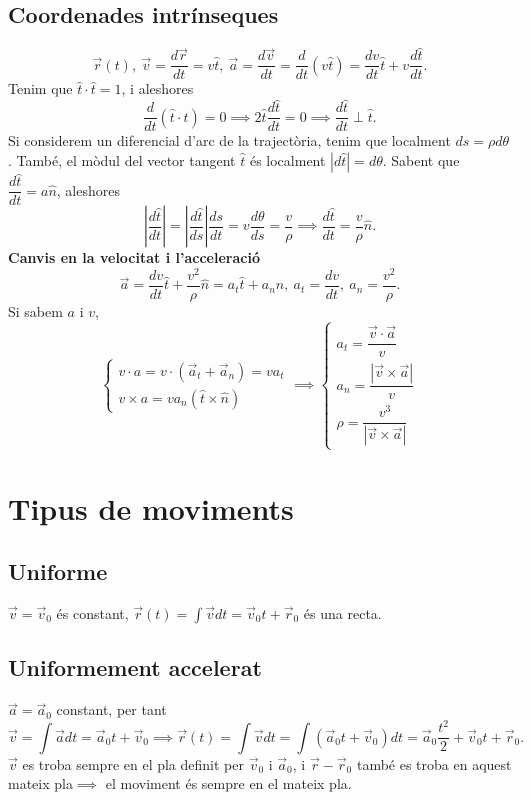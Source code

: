 \subsection{Coordenades intrínseques}
\[\vec{r}(t),\ \vec{v}=\dfrac{d\vec r}{dt}=v\hat t,\ \vec{a}=\dfrac{d\vec v}{dt}=\dfrac{d}{dt}(v\hat t)=\dfrac{dv}{dt}\hat t + v\dfrac{d\hat t}{dt}.\]
Tenim que $\hat t\cdot\hat t=1$, i aleshores 
\[
\dfrac{d}{dt}(\hat t\cdot\hat t)=0\implies2\hat t\dfrac{d\hat t}{dt}=0\implies\dfrac{d\hat t}{dt}\perp\hat t.
\]
Si considerem un diferencial d'arc de la trajectòria, tenim que localment $ds=\rho d\theta$. També, el mòdul del vector tangent $\hat t$ és localment $|d\hat t|=d\theta$. Sabent que $\dfrac{d\hat t}{dt}=a\hat n$, aleshores
\[\left|\dfrac{d\hat t}{dt}\right|=\left|\dfrac{d\hat t}{ds}\right|\dfrac{ds}{dt}=v\dfrac{d\theta}{ds}=\dfrac{v}{\rho}\implies
\dfrac{d\hat t}{dt}=\dfrac{v}{\rho}\hat n.\]
\textbf{Canvis en la velocitat i l'acceleració}
\[\vec a=\dfrac{dv}{dt}\hat t + \dfrac{v^2}{\rho}\hat n=a_t\hat t + a_n\hat n,\ a_t=\dfrac{dv}{dt},\ a_n=\dfrac{v^2}{\rho}.\]
Si sabem $a$ i $v$,
\[\begin{cases}v\cdot a=v\cdot(\vec a_t + \vec a_n)=va_t \\ v\times a=va_n(\hat t\times\hat n)\end{cases}\implies\begin{cases}a_t=\dfrac{\vec v\cdot\vec a}{v}\\ a_n=\dfrac{|\vec v\times\vec a|}{v}\\ \rho=\dfrac{v^3}{|\vec v\times\vec a|}\end{cases}\]

\section{Tipus de moviments}
\subsection{Uniforme}
$\vec v=\vec v_0$ és constant, $\vec r(t)=\int\vec v dt=\vec v_0 t+\vec r_0$ és una recta. 
\subsection{Uniformement accelerat}
$\vec a=\vec a_0$ constant, per tant
\[\vec v=\int\vec a dt=\vec a_0t+\vec v_0\implies\vec r(t)=\int\vec v dt=\int(\vec a_0t+\vec v_0)dt=\vec a_0\dfrac{t^2}{2}+\vec v_0 t+\vec r_0.\]
$\vec v$ es troba sempre en el pla definit per $\vec v_0$ i $\vec a_0$, i $\vec r - \vec r_0$ també es troba en aquest mateix pla$\implies$ el moviment és sempre en el mateix pla.
